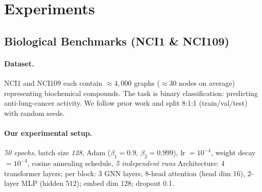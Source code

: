 \documentclass[11pt]{article}
\begin{document}
\section{Experiments}

\subsection{Biological Benchmarks (\textsf{NCI1} \& \textsf{NCI109})}

\paragraph{Dataset.}
\textsf{NCI1} and \textsf{NCI109} each contain ${\approx}4{,}000$ graphs (${\approx}30$ nodes on average) representing biochemical compounds. The task is binary classification: predicting anti-lung-cancer activity. We follow prior work and split 8:1:1 (train/val/test) with random seeds.

\paragraph{Our experimental setup.}
\textit{50 epochs}, batch size \textit{128}, Adam ($\beta_1{=}0.9$, $\beta_2{=}0.999$), lr $= 10^{-4}$, weight decay $= 10^{-4}$, cosine annealing schedule, \textit{5 independent runs}
Architecture: 4 transformer layers; per block: 3 GNN layers, 8-head attention (head dim 16), 2-layer MLP (hidden 512); embed dim 128; dropout 0.1.
\end{document}

